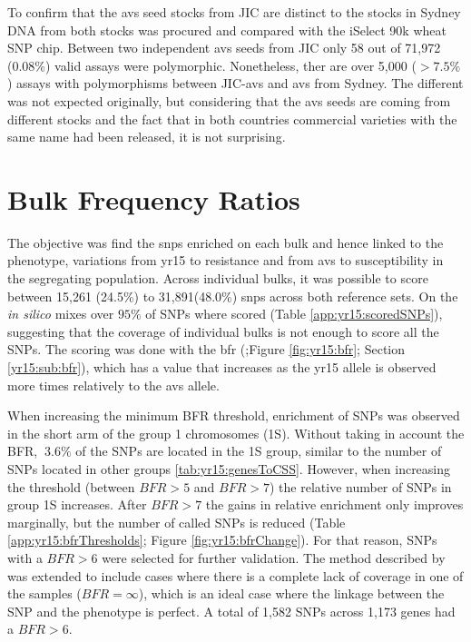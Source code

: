 To confirm that the \acrlong{avs} seed stocks from JIC are distinct to the stocks in Sydney  DNA from both stocks was procured and compared with the iSelect 90k wheat SNP chip. 
Between two independent \acrlong{avs} seeds from JIC only 58 out of 71,972 (0.08\%) valid assays were polymorphic. 
Nonetheless, ther are over 5,000 ($>7.5\%$) assays with polymorphisms between  JIC-\acrlong{avs} and \acrlong{avs} from Sydney. 
The different was not expected originally, but considering that the \acrlong{avs} seeds are coming from different stocks and the fact that in both countries commercial varieties with the same name had been released, it is not surprising. 


\section{Bulk Frequency Ratios}
\label{sec:yr15:bfr}



The objective was find the \acrshort{snp}s enriched on each bulk and hence linked to the phenotype, variations from \acrshort{yr15} to resistance and from \acrshort{avs} to susceptibility in the segregating population. 
Across individual bulks, it was possible to score between 15,261 (24.5\%) to 31,891(48.0\%) \acrshort{snp}s across both reference sets.
On the \textit{in silico} mixes over $95\%$ of SNPs where scored (Table \ref{app:yr15:scoredSNPs}), suggesting that the coverage of individual bulks is not enough to score all the SNPs.  
The scoring was done with the \acrlong{bfr} (\citealt{Trick2012};Figure \ref{fig:yr15:bfr}; Section \ref{yr15:sub:bfr}), which has a value that increases as the \acrshort{yr15} allele is observed more times relatively to the \acrshort{avs} allele.



When increasing the minimum BFR threshold, enrichment of SNPs was observed in the short arm of the group 1 chromosomes (1S). 
Without taking in account the BFR, $~3.6\%$ of the SNPs are located in the 1S group, similar to the number of SNPs located in other groups \ref{tab:yr15:genesToCSS}. 
However, when increasing the threshold  (between $BFR > 5 $ and $BFR > 7$) the relative number of SNPs in group 1S increases. 
After $BFR>7$ the gains in relative enrichment only improves marginally, but the number of called SNPs is reduced (Table \ref{app:yr15:bfrThresholds}; Figure \ref{fig:yr15:bfrChange}).
For that reason, SNPs with a $BFR>6$ were selected for further validation. 
The method described by \citet{Trick2012} was extended to include cases where there is a complete lack of coverage in one of the samples ($BFR=\infty$), which is an ideal case where the linkage between the SNP and the phenotype is perfect. 
A total of 1,582 SNPs across 1,173 genes had a $BFR>6$.



